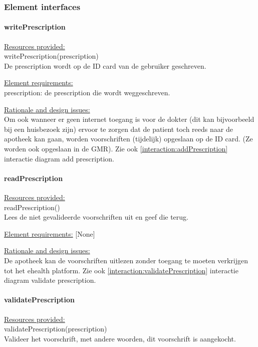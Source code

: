 \documentclass[a4paper,10pt]{article}
\begin{document}
\subsubsection{Element interfaces}
\paragraph{writePrescription}

\underline{Resources provided:}\\
writePrescription(prescription)\\
De prescription wordt op de ID card van de gebruiker geschreven.

\underline{Element requirements:}\\
prescription: de prescription die wordt weggeschreven.

\underline{Rationale and design issues:}\\
Om ook wanneer er geen internet toegang is voor de dokter (dit kan bijvoorbeeld bij een huisbezoek zijn) ervoor te zorgen dat de patient toch reeds naar de apotheek kan gaan, worden voorschriften (tijdelijk) opgeslaan op de ID card.  (Ze worden ook opgeslaan in de GMR).  Zie ook \ref{interaction:addPrescription} interactie diagram add prescription.

\paragraph{readPrescription}

\underline{Resources provided:}\\
readPrescription()\\
Lees de niet gevalideerde voorschriften uit en geef die terug.

\underline{Element requirements:} [None]

\underline{Rationale and design issues:}\\
De apotheek kan de voorschriften uitlezen zonder toegang te moeten verkrijgen tot het ehealth platform.  Zie ook \ref{interaction:validatePrescription} interactie diagram validate prescription.

\paragraph{validatePrescription}

\underline{Resources provided:}\\
validatePrescription(prescription)\\
Valideer het voorschrift, met andere woorden, dit voorschrift is aangekocht.
\end{document}
